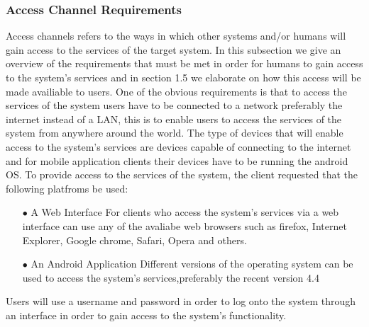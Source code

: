 \documentclass[a4paper,12pt]{article}
\begin{document}
\subsubsection{Access Channel Requirements}
\begin{flushleft}
Access channels refers to the ways in which other systems and/or humans will gain access to the services of the target system. In this subsection we give an overview of the requirements that must be met in order for humans to gain access to the system's services and in section 1.5 we elaborate on how this access will be made availiable to users.
One of the obvious requirements is that to access the services of the system users have to be connected to a network preferably the internet instead of a LAN, this is to enable users to access the services of the system from anywhere around the world. The type of devices that will enable access to the system's services are devices capable of connecting to the internet and for mobile application clients their devices have to be running the android OS.
To provide access to the services of the system, the client requested that the following platfroms
be used:
\begin{itemize}
\item[$\bullet$]A Web Interface
        For clients who access the system's services via a web interface can use any of the avaliabe web browsers such as               firefox, Internet Explorer, Google chrome, Safari, Opera and others. 
\item[$\bullet$]An Android Application
        Different versions of the operating system can be used to access the system's services,preferably the recent                    version 4.4
\\
\end{itemize} 
Users will use a username and password in order to log onto the system through an interface in order to gain access to the system's functionality.
\end{flushleft}
\end{document}

